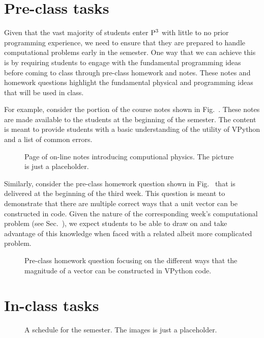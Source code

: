 \documentclass{msuphddissertation}
\begin{document}
\begin{doublespace}
\section{Pre-class tasks}

Given that the vast majority of students enter ${\rm P}^{3}$ with little to no prior programming experience, we need to ensure that they are prepared to handle computational problems early in the semester.  One way that we can achieve this is by requiring students to engage with the fundamental programming ideas before coming to class through pre-class homework and notes.  These notes and homework questions highlight the fundamental physical and programming ideas that will be used in class.

For example, consider the portion of the course notes shown in Fig.~.  These notes are made available to the students at the beginning of the semester.  The content is meant to provide students with a basic understanding of the utility of VPython and a list of common errors.

\begin{figure}[ht]\centering
\caption{Page of on-line notes introducing computional physics.  The picture is just a placeholder.}
\end{figure} 

Similarly, consider the pre-class homework question shown in Fig.~ that is delivered at the beginning of the third week.  This question is meant to demonstrate that there are multiple correct ways that a unit vector can be constructed in code.  Given the nature of the corresponding week's computational problem (see Sec.~), we expect students to be able to draw on and take advantage of this knowledge when faced with a related albeit more complicated problem.

\begin{figure}[ht]\centering
\caption{Pre-class homework question focusing on the different ways that the magnitude of a vector can be constructed in VPython code.}
\end{figure} 

\section{In-class tasks}

\begin{figure}[ht]\centering
\caption{A schedule for the semester.  The images is just a placeholder.}
\end{figure}


\end{doublespace}
\end{document}

